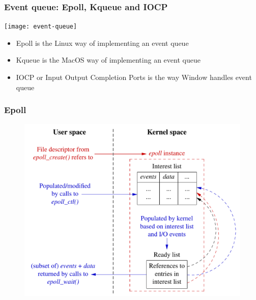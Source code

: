 \begin{frame}[fragile]
    \frametitle{Event queue: Epoll, Kqueue and IOCP}
% 
% 
% 
    \centering
	\texttt{[image: event-queue]}
    \begin{itemize}
    	    \item Epoll is the Linux way of implementing an event queue
    	    \item Kqueue is the MacOS way of implementing an event queue
    	    \item IOCP or Input Output Completion Ports is the way Window handles event queue
    \end{itemize}

\end{frame}
\begin{frame}[fragile]
    \frametitle{Epoll}
% 
% 
    \begin{figure}
    \includegraphics[width=0.55\linewidth]{figs/epoll.png}
    \end{figure}
% 
\end{frame}
